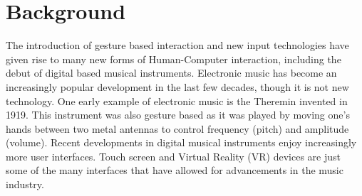 \documentclass[conference,compsoc]{IEEEtran}
\begin{document}
%


\section{Background}
The introduction of gesture based interaction and new input technologies have given rise to many new forms of Human-Computer interaction, including the debut of digital based musical instruments. Electronic music has become an increasingly popular development in the last few decades, though it is not new technology. One early example of electronic music is the Theremin invented in 1919. This instrument was also gesture based as it was played by moving one’s hands between two metal antennas to control frequency (pitch) and amplitude (volume). Recent developments in digital musical instruments enjoy increasingly more user interfaces. Touch screen and Virtual Reality (VR) devices are just some of the many interfaces that have allowed for advancements in the music industry.
\end{document}
